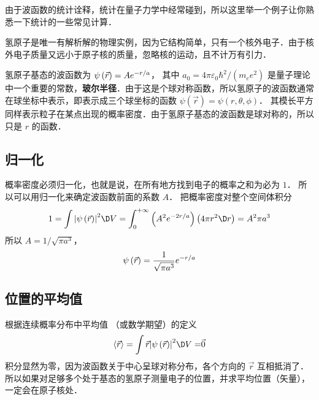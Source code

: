 
由于波函数的统计诠释，统计在量子力学中经常碰到，所以这里举一个例子让你熟悉一下统计的一些常见计算．

氢原子是唯一有解析解的物理实例，因为它结构简单，只有一个核外电子．由于核外电子质量又远小于原子核的质量，忽略核的运动，且不计万有引力．

氢原子基态的波函数为 $\psi \left( {\vec r} \right) = A{e^{ - {r \mathord{\left/{\vphantom {r a}} \right. \kern-\nulldelimiterspace} a}}}$， 其中 ${a_0} = {{4\pi {\varepsilon _0}{\hbar ^2}}}/({{{m_e}{e^2}}})$ 是量子理论中一个重要的常数，\textbf{玻尔半径}．由于这是个球对称函数，所以氢原子的波函数通常在球坐标中表示，即表示成三个球坐标的函数 $\psi \left( {\vec r} \right) = \psi \left( {r,\theta ,\phi } \right)$． 其模长平方同样表示粒子在某点出现的概率密度．由于氢原子基态的波函数是球对称的，所以只是 $r$ 的函数．

\subsection{归一化}
  
概率密度必须归一化，也就是说，在所有地方找到电子的概率之和为必为 $1$． 所以可以用归一化来确定波函数前面的系数 $A$． 把概率密度对整个空间体积分
\begin{equation}
    1 = \int {{{\left| {\psi \left( {\vec r} \right)} \right|}^2} \D V}  = \int_0^{ + \infty } {\left( {{A^2}{e^{ - 2{r \mathord{\left/
 {\vphantom {r a}} \right.
 \kern-\nulldelimiterspace} a}}}} \right)\left( {4\pi {r^2} \D r} \right)}  = {A^2}\pi {a^3}
  \end{equation}
  所以 $A = {1}/{{\sqrt {\pi {a^3}} }}$， 
  \begin{equation}
    \psi \left( {\vec r} \right) = \frac{1}{{\sqrt {\pi {a^3}} }}{e^{ - {r \mathord{\left/
 {\vphantom {r a}} \right.
 \kern-\nulldelimiterspace} a}}}
  \end{equation}

\subsection{位置的平均值}

 根据连续概率分布中平均值%
（或数学期望）的定义
\begin{equation}
\left\langle {\vec r} \right\rangle  = \int {\vec r{{\left| {\psi \left( {\vec r} \right)} \right|}^2} \D V = } \vec 0
\end{equation}
积分显然为零，因为波函数关于中心呈球对称分布，各个方向的 $\vec r$ 互相抵消了．所以如果对足够多个处于基态的氢原子测量电子的位置，并求平均位置（矢量）， 一定会在原子核处．

